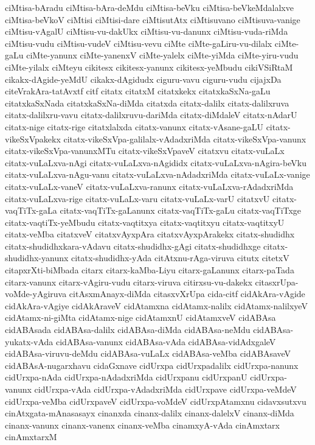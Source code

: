 {ciMtisa-bAradu
ciMtisa-bAra-deMdu
ciMtisa-beVku
ciMtisa-beVkeMdalalxve
ciMtisa-beVkoV
ciMtisi
ciMtisi-dare
ciMtisutAtx
ciMtisuvano
ciMtisuva-vanige
ciMtisu-vAgalU
ciMtisu-vu-dakUkx
ciMtisu-vu-danunx
ciMtisu-vuda-riMda
ciMtisu-vudu
ciMtisu-vudeV
ciMtisu-vevu
ciMte
ciMte-gaLiru-vu-dilalx
ciMte-gaLu
ciMte-yanunx
ciMte-yanenxV
ciMte-yalelx
ciMte-yiMda
ciMte-yiru-vudu
ciMte-yilalx
ciMteyu
cikitesx
cikitesx-yanunx
cikitesx-yeMbudu
cikiVSiRtaM
cikakx-dAgide-yeMdU
cikakx-dAgidudx
ciguru-vavu
ciguru-vudu
cijajxDa
citeVrakAra-tatAvxtf
citf
citatx
citatxM
citatxkekx
citatxkaSxNa-gaLu
citatxkaSxNada
citatxkaSxNa-diMda
citatxda
citatx-dalilx
citatx-dalilxruva
citatx-dalilxru-vavu
citatx-dalilxruvu-dariMda
citatx-diMdaleV
citatx-nAdarU
citatx-nige
citatx-rige
citatxlalxda
citatx-vanunx
citatx-vAsane-gaLU
citatx-vikeSxVpakekx
citatx-vikeSxVpa-galilalx-vAdadxriMda
citatx-vikeSxVpa-vanunx
citatx-vikeSxVpa-vanunxMTu
citatx-vikeSxVpaveV
citatxvu
citatx-vuLaLx
citatx-vuLaLxva-nAgi
citatx-vuLaLxva-nAgididx
citatx-vuLaLxva-nAgira-beVku
citatx-vuLaLxva-nAgu-vanu
citatx-vuLaLxva-nAdadxriMda
citatx-vuLaLx-vanige
citatx-vuLaLx-vaneV
citatx-vuLaLxva-ranunx
citatx-vuLaLxva-rAdadxriMda
citatx-vuLaLxva-rige
citatx-vuLaLx-varu
citatx-vuLaLx-varU
citatxvU
citatx-vaqTiTx-gaLa
citatx-vaqTiTx-gaLanunx
citatx-vaqTiTx-gaLu
citatx-vaqTiTxge
citatx-vaqtiTx-yeMbudu
citatx-vaqtitxya
citatx-vaqtitxyu
citatx-vaqtitxyU
citatx-veMba
citatxveV
citatxvAyxpAra
citatxvAyxpArakekx
citatx-shudidhx
citatx-shudidhxkara-vAdavu
citatx-shudidhx-gAgi
citatx-shudidhxge
citatx-shudidhx-yanunx
citatx-shudidhx-yAda
citAtxnu-rAga-viruva
citutx
citetxV
citapxrXti-biMbada
citarx
citarx-kaMba-Liyu
citarx-gaLanunx
citarx-paTada
citarx-vanunx
citarx-vAgiru-vudu
citarx-viruva
citirxsu-vu-dakekx
citasxrUpa-voMde-yAgiruva
citAsxmAnayx-diMda
citasxvXrUpa
cida-citf
cidAkAra-vAgide
cidAkAra-vAgiye
cidAkAraveV
cidAtamxna
cidAtamx-nalilx
cidAtamx-nalilxyeV
cidAtamx-ni-giMta
cidAtamx-nige
cidAtamxnU
cidAtamxveV
cidABAsa
cidABAsada
cidABAsa-dalilx
cidABAsa-diMda
cidABAsa-neMdu
cidABAsa-yukatx-vAda
cidABAsa-vanunx
cidABAsa-vAda
cidABAsa-vidAdxgaleV
cidABAsa-viruvu-deMdu
cidABAsa-vuLaLx
cidABAsa-veMba
cidABAsaveV
cidABAsA-nugarxhavu
cidaGxnave
cidUrxpa
cidUrxpadalilx
cidUrxpa-nanunx
cidUrxpa-nAda
cidUrxpa-nAdadxriMda
cidUrxpanu
cidUrxpanU
cidUrxpa-vanunx
cidUrxpa-vAda
cidUrxpa-vAdadxriMda
cidUrxpave
cidUrxpa-veMdeV
cidUrxpa-veMba
cidUrxpaveV
cidUrxpa-voMdeV
cidUrxpAtamxnu
cidavxsutxvu
cinAtxgata-mAnasasayx
cinanxda
cinanx-dalilx
cinanx-dalelxV
cinanx-diMda
cinanx-vanunx
cinanx-vanenx
cinanx-veMba
cinamxyA-vAda
cinAmxtarx
cinAmxtarxM
}
